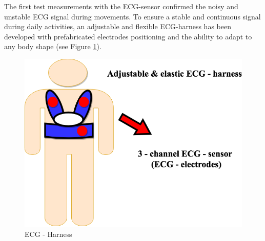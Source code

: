 \documentclass[review]{elsarticle}
\begin{document}
The first test measurements with the ECG-sensor confirmed the noisy and unstable ECG signal during movements. To ensure a stable and continuous signal during daily activities, an adjustable and flexible ECG-harness has been developed with prefabricated electrodes positioning and the ability to adapt to any body shape (see Figure \ref{fig:ECGHarness}).
\begin{figure}[!ht]
	\centering
	\includegraphics[scale=0.32]{Images/ECG-Harness.png}
	\caption[ECG - Harness]{ECG - Harness}
	\label{fig:ECGHarness}
\end{figure}
\newpage
\end{document}
